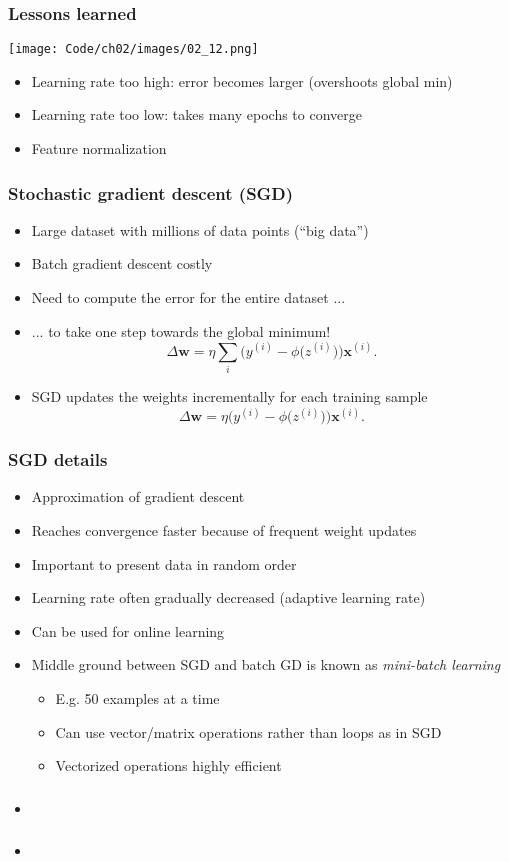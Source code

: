 \documentclass{beamer}
\begin{document}
\begin{frame}
  \frametitle{Lessons learned}
  \texttt{[image: Code/ch02/images/02\_12.png]}
  \begin{itemize}    
  \item Learning rate too high: error becomes larger (overshoots global min)
  \item Learning rate too low: takes many epochs to converge
    \item Feature normalization
  \end{itemize}
\end{frame}

\begin{frame}
  \frametitle{Stochastic gradient descent (SGD)}
  \begin{itemize}
  \item Large dataset with millions of data points (``big data'')
  \item Batch gradient descent costly
  \item Need to compute the error for the entire dataset ...
  \item ... to take one step towards the global minimum!
    \[
    \Delta \mathbf{w} = \eta \sum_i \bigg( y^{(i)} - \phi \big( z^{(i)}\big) \bigg) \mathbf{x}^{(i)}.
    \]  
  \item SGD updates the weights incrementally for each training sample
    \[
    \Delta \mathbf{w} = \eta  \bigg( y^{(i)} - \phi \big( z^{(i)}\big) \bigg) \mathbf{x}^{(i)}.
    \]
  \end{itemize}
\end{frame}

\begin{frame}
  \frametitle{SGD details}
  \begin{itemize}
  \item Approximation of gradient descent
  \item Reaches convergence faster because of frequent weight updates
  \item Important to present data in random order
  \item Learning rate often gradually decreased (adaptive learning rate)
  \item Can be used for online learning
  \item Middle ground between SGD and batch GD is known as \emph{mini-batch learning}
    \begin{itemize}
    \item E.g. 50 examples at a time
    \item Can use vector/matrix operations rather than loops as in SGD
    \item Vectorized operations highly efficient
    \end{itemize}
  \end{itemize}
\end{frame}

\begin{frame}
  \frametitle{}
  \begin{itemize}
  \item
  \end{itemize}
\end{frame}

\begin{frame}
  \frametitle{}
  \begin{itemize}
  \item
  \end{itemize}
\end{frame}
\end{document}
